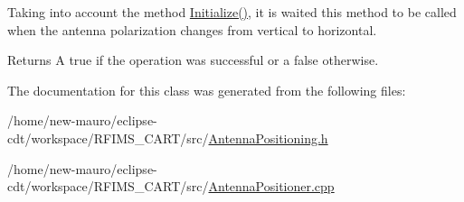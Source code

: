 Taking into account the method \hyperlink{classAntennaPositioner_a5087caa452709b33082c41b2cef2a23e}{Initialize()}, it is waited this method to be called when the antenna polarization changes from vertical to horizontal. \begin{DoxyReturn}{Returns}
A {\ttfamily true} if the operation was successful or a {\ttfamily false} otherwise. 
\end{DoxyReturn}


The documentation for this class was generated from the following files\+:\begin{DoxyCompactItemize}
\item 
/home/new-\/mauro/eclipse-\/cdt/workspace/\+R\+F\+I\+M\+S\+\_\+\+C\+A\+R\+T/src/\hyperlink{AntennaPositioning_8h}{Antenna\+Positioning.\+h}\item 
/home/new-\/mauro/eclipse-\/cdt/workspace/\+R\+F\+I\+M\+S\+\_\+\+C\+A\+R\+T/src/\hyperlink{AntennaPositioner_8cpp}{Antenna\+Positioner.\+cpp}\end{DoxyCompactItemize}
